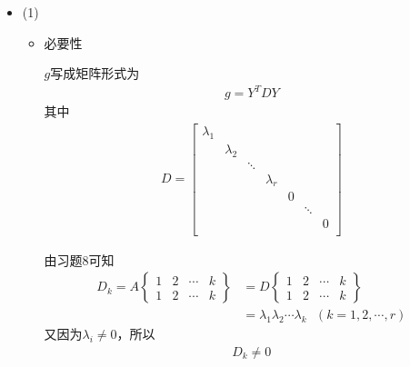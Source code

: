 \documentclass{article}
\begin{document}
\begin{itemize}
  \item (1)

        \begin{itemize}
          \item 必要性

                $g$写成矩阵形式为
                \begin{align*}
                  g = Y^T D Y
                \end{align*}
                其中
                \begin{align*}
                  D = \begin{bmatrix}
                        \lambda_1                                          \\
                         & \lambda_2                                       \\
                         &           & \ddots                              \\
                         &           &        & \lambda_r                  \\
                         &           &        &           & 0              \\
                         &           &        &           &   & \ddots     \\
                         &           &        &           &   &        & 0 \\
                      \end{bmatrix}
                \end{align*}

                由习题8可知
                \begin{align*}
                  D_k = A \begin{Bmatrix}
                            1 & 2 & \cdots & k \\
                            1 & 2 & \cdots & k
                          \end{Bmatrix}
                   & = D \begin{Bmatrix}
                           1 & 2 & \cdots & k \\
                           1 & 2 & \cdots & k
                         \end{Bmatrix}                 \\
                   & = \lambda_1 \lambda_2 \cdots \lambda_k
                  \ \ \ (k = 1, 2, \cdots, r)
                \end{align*}
                又因为$\lambda_i \neq 0$，所以
                \begin{align*}
                  D_k \neq 0
                \end{align*}


\end{itemize}
\end{itemize}
\end{document}
